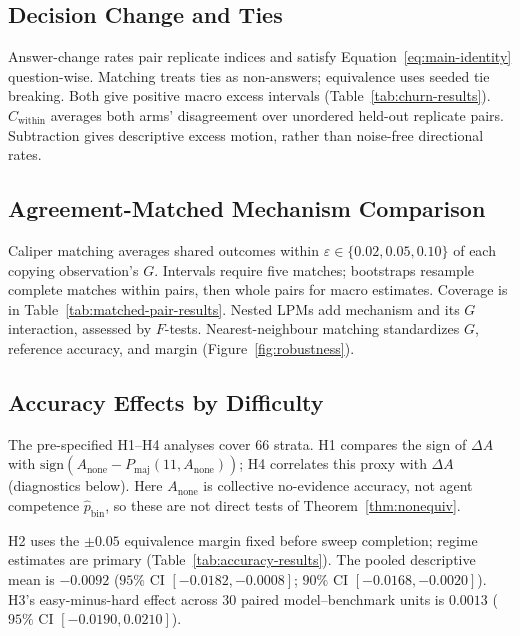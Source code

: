 \documentclass[11pt,a4paper]{article}
\theoremstyle{definition}
\begin{document}
\subsection{Decision Change and Ties}
\label{sec:app-est-dy}

Answer-change rates pair replicate indices and satisfy
Equation~\ref{eq:main-identity} question-wise. Matching treats ties as
non-answers; equivalence uses seeded tie breaking. Both give positive macro
excess intervals (Table~\ref{tab:churn-results}). $C_{\mathrm{within}}$ averages
both arms' disagreement over unordered held-out replicate pairs. Subtraction
gives descriptive excess motion, rather than noise-free directional rates.

\subsection{Agreement-Matched Mechanism Comparison}
\label{sec:app-est-matched}

Caliper matching averages shared outcomes within
$\varepsilon\in\{0.02,0.05,0.10\}$ of each copying observation's $G$.
Intervals require five matches; bootstraps resample complete matches within
pairs, then whole pairs for macro estimates. Coverage is in
Table~\ref{tab:matched-pair-results}. Nested LPMs add mechanism and its $G$
interaction, assessed by $F$-tests. Nearest-neighbour matching standardizes
$G$, reference accuracy, and margin (Figure~\ref{fig:robustness}).

\subsection{Accuracy Effects by Difficulty}
\label{sec:app-est-regime-battery}

The pre-specified H1--H4 analyses cover $66$ strata.
H1 compares the sign of $\Delta A$ with
$\mathrm{sign}(A_{\mathrm{none}}-P_{\mathrm{maj}}(11,A_{\mathrm{none}}))$;
H4 correlates this proxy with $\Delta A$
(diagnostics below). Here $A_{\mathrm{none}}$
is collective no-evidence accuracy, not agent competence
$\widehat p_{\mathrm{bin}}$, so these are not direct tests of
Theorem~\ref{thm:nonequiv}.

H2 uses the $\pm0.05$ equivalence margin fixed before sweep completion;
regime estimates are primary (Table~\ref{tab:accuracy-results}).
The pooled descriptive mean is $-0.0092$ ($95\%$ CI
$[-0.0182,-0.0008]$; $90\%$ CI $[-0.0168,-0.0020]$).
H3's easy-minus-hard effect across $30$ paired model--benchmark units is
$0.0013$ ($95\%$ CI $[-0.0190,0.0210]$).
\end{document}
